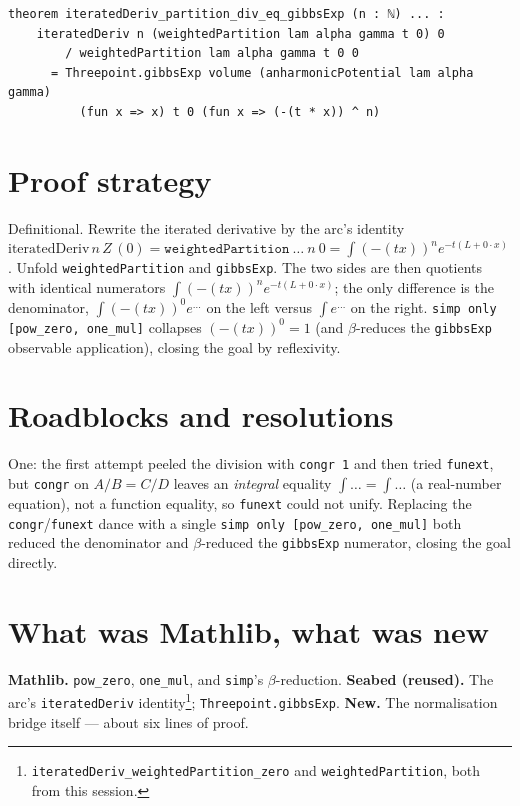 \documentclass[11pt]{article}
\begin{document}
\begin{verbatim}
theorem iteratedDeriv_partition_div_eq_gibbsExp (n : ℕ) ... :
    iteratedDeriv n (weightedPartition lam alpha gamma t 0) 0
        / weightedPartition lam alpha gamma t 0 0
      = Threepoint.gibbsExp volume (anharmonicPotential lam alpha gamma)
          (fun x => x) t 0 (fun x => (-(t * x)) ^ n)
\end{verbatim}

\section{Proof strategy}

Definitional. Rewrite the iterated derivative by the arc's identity
$\mathrm{iteratedDeriv}\,n\,Z\,(0) = \texttt{weightedPartition}\ \dots\ n\ 0
= \int (-(tx))^n e^{-t(L+0\cdot x)}$. Unfold \texttt{weightedPartition} and
\texttt{gibbsExp}. The two sides are then quotients with identical numerators
$\int (-(tx))^n e^{-t(L+0\cdot x)}$; the only difference is the denominator,
$\int (-(tx))^0 e^{\dots}$ on the left versus $\int e^{\dots}$ on the right.
\texttt{simp only [pow\_zero, one\_mul]} collapses $(-(tx))^0 = 1$ (and
$\beta$-reduces the \texttt{gibbsExp} observable application), closing the
goal by reflexivity.

\section{Roadblocks and resolutions}

One: the first attempt peeled the division with \texttt{congr 1} and then
tried \texttt{funext}, but \texttt{congr} on $A/B = C/D$ leaves an
\emph{integral} equality $\int\dots = \int\dots$ (a real-number equation), not
a function equality, so \texttt{funext} could not unify. Replacing the
\texttt{congr}/\texttt{funext} dance with a single \texttt{simp only
[pow\_zero, one\_mul]} both reduced the denominator and $\beta$-reduced the
\texttt{gibbsExp} numerator, closing the goal directly.

\section{What was Mathlib, what was new}

\textbf{Mathlib.} \texttt{pow\_zero}, \texttt{one\_mul}, and \texttt{simp}'s
$\beta$-reduction.
\textbf{Seabed (reused).} The arc's \texttt{iteratedDeriv} identity\footnote{%
\texttt{iteratedDeriv\_weightedPartition\_zero} and \texttt{weightedPartition},
both from this session.}; \texttt{Threepoint.gibbsExp}.
\textbf{New.} The normalisation bridge itself --- about six lines of proof.
\end{document}
